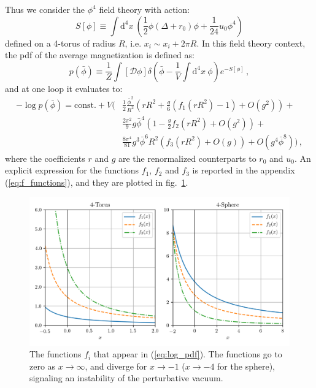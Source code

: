 \documentclass[11pt,a4paper]{article}
\newcommand{\dd}{\mathrm{d}}
\begin{document}
Thus we consider the $\phi^4$ field theory with action:
\begin{equation}
  S[\phi] \equiv \int \dd^4 x\ \left(
    \frac{1}{2} \phi\left(\Delta + r_0\right)\phi +
    \frac{1}{24} u_0 \phi^4\right)
\end{equation}
defined on a 4-torus of radius $R$, i.e. $x_i\sim x_i + 2\pi R$. In this field
theory context, the pdf of the average magnetization is defined as:
\begin{equation}
    \label{eq:pdf_definition}
    p(\bar\phi) \equiv \frac{1}{Z} \int \left[\mathcal{D}\phi\right]
    \delta\left(\bar{\phi} - \frac{1}{V}\int\dd^4 x\ \phi\right)
    e^{-S[\phi]}\,,
\end{equation}
and at one loop it evaluates to:
\begin{equation}
\label{eq:log_pdf}
\begin{split}
    -\log p(\bar{\phi}) = \mathrm{const.} +  V\Bigg(
  &\frac{1}{2} \frac{\bar{\phi}^2}{R^2} \left(
    r R^2 + \frac{g}{6} \left(f_1\left(r R^2\right) - 1\right)
    + O\left(g^2\right)\right) + \\
  & \frac{2\pi^2}{9}g\bar{\phi}^4\left(
    1 - \frac{g}{2}f_2\left(r R^2\right)
    + O\left(g^2\right)\right) + \\
  & \frac{8\pi^4}{81} g^3 \bar{\phi}^6 R^2\left(
    f_3\left(r R^2\right)
    + O\left(g\right)\right) + O\left(g^4\bar{\phi}^8\right) \Bigg)\,,
\end{split}
\end{equation}
where the coefficients $r$ and $g$ are the renormalized counterparts to $r_0$
and $u_0$. An explicit expression for the functions $f_1$, $f_2$ and $f_3$ is
reported in the appendix (\ref{eq:f_functions}), and they are plotted in
fig.~\ref{fig:f_functions}.

\begin{figure}
\begin{center}
\includegraphics[scale=0.75]{f_functions.png}
\end{center}
\caption{\label{fig:f_functions} The functions $f_i$ that appear in
    (\ref{eq:log_pdf}). The functions go to zero as $x\to\infty$, and diverge
    for $x\to-1$ ($x\to-4$ for the sphere), signaling an instability of the
    perturbative vacuum.}
\end{figure}
\end{document}
